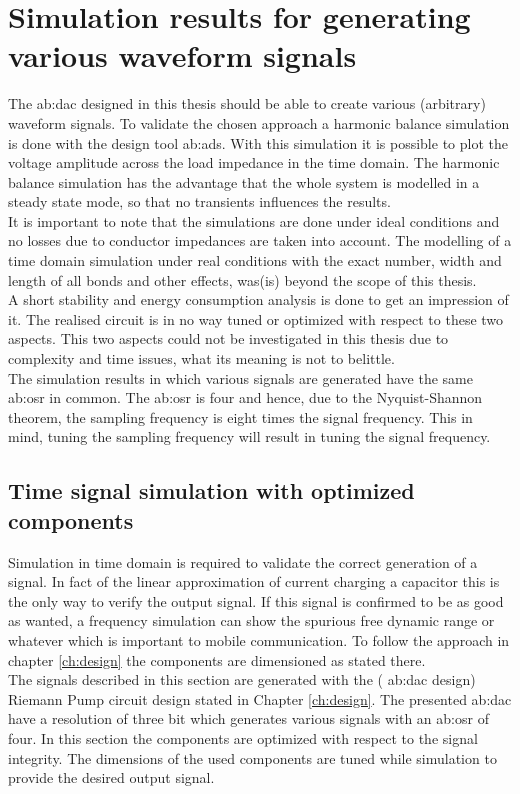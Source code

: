 \chapter{Simulation results for generating various waveform signals}

The \gls{ab:dac} designed in this thesis should be able to create various (arbitrary) waveform signals.
 To validate the chosen approach a harmonic balance simulation is done with the design tool \gls{ab:ads}.
  With this simulation it is possible to plot the voltage amplitude across the load impedance in the time domain.
   The harmonic balance simulation has the advantage that the whole system is modelled in a steady state mode, so that no transients influences the results.\\
    It is important to note that the simulations are done under ideal conditions and no losses due to conductor impedances are taken into account.
    The modelling of a time domain simulation under real conditions with the exact number, width and length of all bonds and other effects, was(is) beyond the scope of this thesis.\\
    A short stability and energy consumption analysis is done to get an impression of it. 
    The realised circuit is in no way tuned or optimized with respect to these two aspects.
     This two aspects could not be investigated in this thesis due to complexity and time issues, what its meaning is not to belittle.\\
    
The simulation results in which various signals are generated have the same \gls{ab:osr} in common.
The \gls{ab:osr} is four and hence, due to the Nyquist-Shannon theorem, the sampling frequency is eight times the signal frequency.
This in mind, tuning the sampling frequency will result in tuning the signal frequency. 

\section{Time signal simulation with optimized components}
Simulation in time domain is required to validate the correct generation of a signal. In fact of the linear approximation of current charging a capacitor this is the only way to verify the output signal. If this signal is confirmed to be as good as wanted, a frequency simulation can show the spurious free dynamic range or whatever which is important to mobile communication. To follow the approach in chapter \ref{ch:design} the components are dimensioned as stated there.\\
 The signals described in this section are generated with the ( \gls{ab:dac} design) Riemann Pump circuit design stated in Chapter \ref{ch:design}. The presented \gls{ab:dac} have a resolution of three bit which generates various signals with an \gls{ab:osr} of four. 
 In this section the components are optimized with respect to the signal integrity. The dimensions of the used components are tuned while simulation to provide the desired output signal.
 
